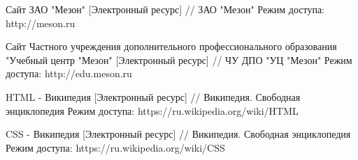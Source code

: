 \begingroup
\renewcommand{\section}[2]{\anonsection{Список использованных источников}}
\begin{thebibliography}{00}
        Сайт ЗАО "Мезон"
        [Электронный ресурс] //
        ЗАО "Мезон"
        Режим доступа: http://meson.ru

        Сайт Частного учреждения дополнительного профессионального образования "Учебный центр "Мезон"
        [Электронный ресурс] //
        ЧУ ДПО "УЦ "Мезон"
        Режим доступа: http://edu.meson.ru

        HTML - Википедия 
        [Электронный ресурс] //
        Википедия. Свободная энциклопедия
        Режим доступа: https://ru.wikipedia.org/wiki/HTML

        CSS - Википедия 
        [Электронный ресурс] //
        Википедия. Свободная энциклопедия
        Режим доступа: https://ru.wikipedia.org/wiki/CSS



\end{thebibliography}
\endgroup

\clearpage
